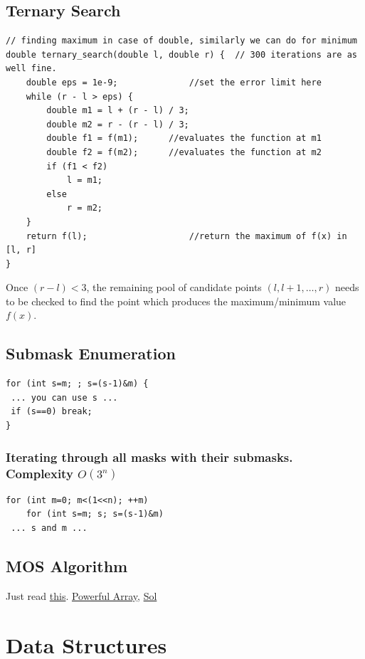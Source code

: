 \documentclass[8pt, a4paper, oneside, twocolumn]{extarticle}
\begin{document}
\subsection{Ternary Search}
\begin{verbatim}
// finding maximum in case of double, similarly we can do for minimum
double ternary_search(double l, double r) {  // 300 iterations are as well fine.
    double eps = 1e-9;              //set the error limit here
    while (r - l > eps) {
        double m1 = l + (r - l) / 3;
        double m2 = r - (r - l) / 3;
        double f1 = f(m1);      //evaluates the function at m1
        double f2 = f(m2);      //evaluates the function at m2
        if (f1 < f2)
            l = m1;
        else
            r = m2;
    }
    return f(l);                    //return the maximum of f(x) in [l, r]
}
\end{verbatim}
Once $(r - l) < 3$, the remaining pool of candidate points $(l, l + 1, \ldots, r)$ needs to be checked to find the point which produces the maximum/minimum value $f(x)$.
\subsection{Submask Enumeration}
\begin{verbatim}
for (int s=m; ; s=(s-1)&m) {
 ... you can use s ...
 if (s==0) break;
}
\end{verbatim}
\subsubsection{Iterating through all masks with their submasks. Complexity $O(3^n)$}
\begin{verbatim}
for (int m=0; m<(1<<n); ++m)
	for (int s=m; s; s=(s-1)&m)
 ... s and m ...
\end{verbatim}
\subsection{MOS Algorithm}
Just read \href{https://blog.anudeep2011.com/mos-algorithm/}{this}. \href{https://codeforces.com/contest/86/problem/D}{Powerful Array}, \href{https://codeforces.com/contest/86/submission/39212866}{Sol}
\section{Data Structures}
\end{document}
